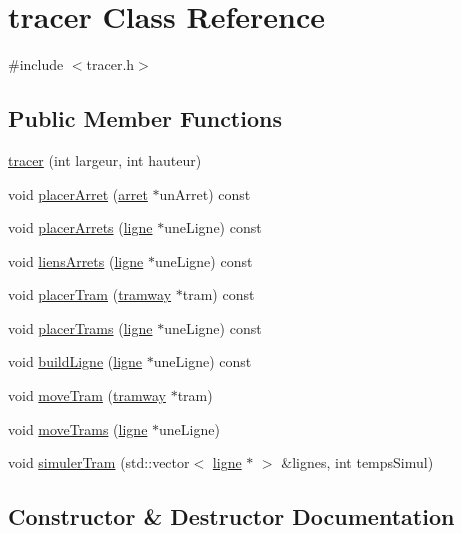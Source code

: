 \hypertarget{classtracer}{}\section{tracer Class Reference}
\label{classtracer}


{\ttfamily \#include $<$tracer.\+h$>$}

\subsection*{Public Member Functions}
\begin{DoxyCompactItemize}
\item 
\hyperlink{classtracer_ad341e6024da0488dd9c3ff9767333ab0}{tracer} (int largeur, int hauteur)
\item 
void \hyperlink{classtracer_a4d68d6842a65f6f153026357847b49fc}{placer\+Arret} (\hyperlink{classarret}{arret} $\ast$un\+Arret) const 
\item 
void \hyperlink{classtracer_a9d82959867464033e3b68892023969ce}{placer\+Arrets} (\hyperlink{classligne}{ligne} $\ast$une\+Ligne) const 
\item 
void \hyperlink{classtracer_a37ba471b0824655b4a6a2820d6b7ee56}{liens\+Arrets} (\hyperlink{classligne}{ligne} $\ast$une\+Ligne) const 
\item 
void \hyperlink{classtracer_a747a35b63db6765185c0de6f652f8c13}{placer\+Tram} (\hyperlink{classtramway}{tramway} $\ast$tram) const 
\item 
void \hyperlink{classtracer_ae50f04257d21db5b947cd8548414a0f7}{placer\+Trams} (\hyperlink{classligne}{ligne} $\ast$une\+Ligne) const 
\item 
void \hyperlink{classtracer_a31536796cd89d2ee47a7d5e17432bc65}{build\+Ligne} (\hyperlink{classligne}{ligne} $\ast$une\+Ligne) const 
\item 
void \hyperlink{classtracer_a59f9f4e714b1ebcf114ae7ca648e7d8c}{move\+Tram} (\hyperlink{classtramway}{tramway} $\ast$tram)
\item 
void \hyperlink{classtracer_a206500c8582dbad012b898dc922fc5a7}{move\+Trams} (\hyperlink{classligne}{ligne} $\ast$une\+Ligne)
\item 
void \hyperlink{classtracer_a1ac543894333a48a09a1a423d33b20a5}{simuler\+Tram} (std\+::vector$<$ \hyperlink{classligne}{ligne} $\ast$ $>$ \&lignes, int temps\+Simul)
\end{DoxyCompactItemize}


\subsection{Constructor \& Destructor Documentation}
